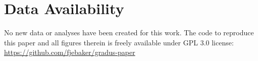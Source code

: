 \documentclass[fleqn,usenatbib]{mnras}
\begin{document}
\section*{Data Availability}

No new data or analyses have been created for this work. The code to reproduce
this paper and all figures therein is freely available under GPL 3.0 license:
\url{https://github.com/fjebaker/gradus-paper}










\appendix







\bsp    %
\label{lastpage}
\end{document}
